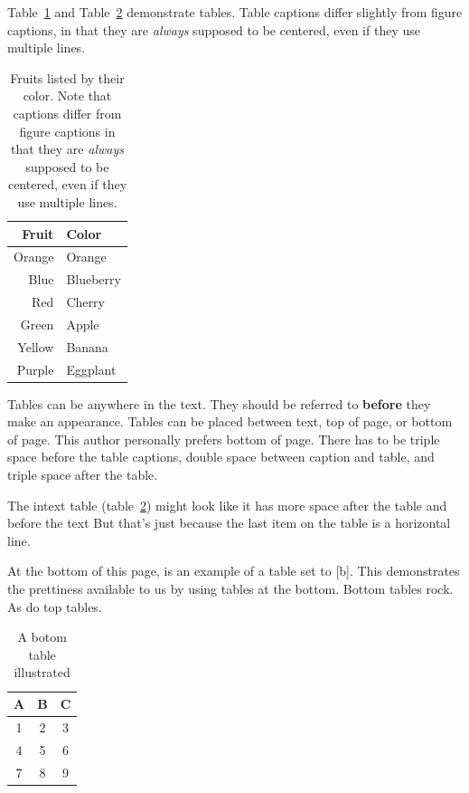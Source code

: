 Table~\ref{table_fruit} and Table~\ref{table_silly} demonstrate tables. Table
captions differ slightly from figure captions, in that they are \textit{always}
supposed to be centered, even if they use multiple lines.

\begin{table}[h]
\centering
\caption[Fruits by color]{\centering Fruits listed by their color. Note that
captions differ from figure captions in that they are \textit{always} supposed
to be centered, even if they use multiple lines.}
\label{table_fruit}
\begin{tabular}{rl}
    \hline
    Fruit & Color  \\  \hline
    Orange & Orange \\
    Blue & Blueberry \\
    Red & Cherry \\
    Green & Apple \\
    Yellow & Banana \\
    Purple & Eggplant \\
    \hline
\end{tabular}
\end{table}

Tables can be anywhere in the text. They should be referred to \textbf{before} they make an appearance. 
Tables can be placed between text, top of page, or bottom of page. This author personally prefers bottom of page. 
There has to be triple space before the table captions, double space between caption and table, and triple space after the table. 

The intext table (table~\ref{table_silly}) might look like it has more space after the table and before the text
But that's just because the last item on the table is a horizontal line. 

At the bottom of this page, is an example of a table set to [b]. This demonstrates the prettiness available to us by using tables at the bottom. 
Bottom tables rock. As do top tables. 
\begin{table}[b]
\centering
\caption[A bottom table]{A botom table illustrated}
\label{table_silly}
\begin{tabular}{ccc}
    \hline
    A & B & C \\  \hline
    1 & 2 & 3 \\
    4 & 5 & 6 \\
    7 & 8 & 9 \\
    \hline
\end{tabular}
\end{table}


